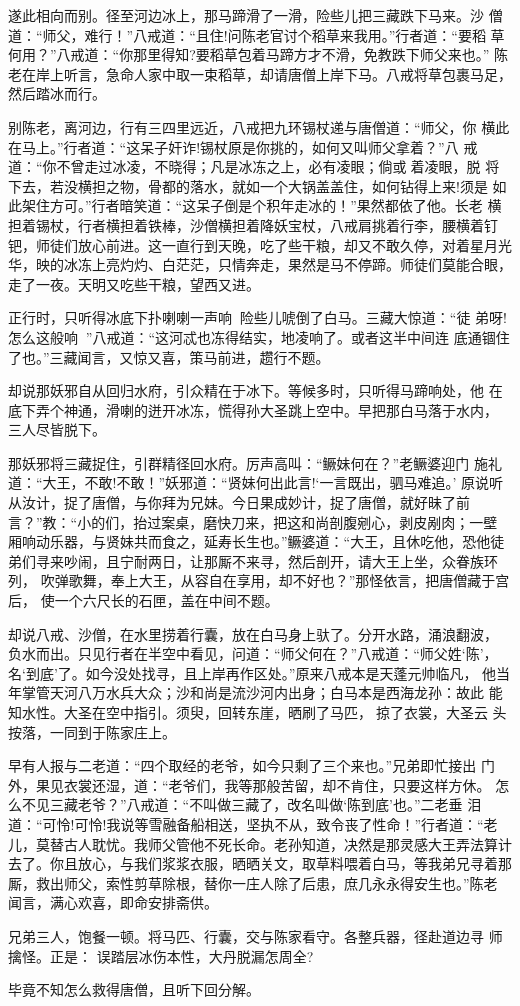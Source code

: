 遂此相向而别。径至河边冰上，那马蹄滑了一滑，险些儿把三藏跌下马来。沙
僧道：“师父，难行！”八戒道：“且住!问陈老官讨个稻草来我用。”行者道：“要稻
草何用？”八戒道：“你那里得知?要稻草包着马蹄方才不滑，免教跌下师父来也。”
陈老在岸上听言，急命人家中取一束稻草，却请唐僧上岸下马。八戒将草包裹马足，
然后踏冰而行。

别陈老，离河边，行有三四里远近，八戒把九环锡杖递与唐僧道：“师父，你
横此在马上。”行者道：“这呆子奸诈!锡杖原是你挑的，如何又叫师父拿着？”八
戒道：“你不曾走过冰凌，不晓得；凡是冰冻之上，必有凌眼；倘或着凌眼，脱
将下去，若没横担之物，骨都的落水，就如一个大锅盖盖住，如何钻得上来!须是
如此架住方可。”行者暗笑道：“这呆子倒是个积年走冰的！”果然都依了他。长老
横担着锡杖，行者横担着铁棒，沙僧横担着降妖宝杖，八戒肩挑着行李，腰横着钉
钯，师徒们放心前进。这一直行到天晚，吃了些干粮，却又不敢久停，对着星月光
华，映的冰冻上亮灼灼、白茫茫，只情奔走，果然是马不停蹄。师徒们莫能合眼，
走了一夜。天明又吃些干粮，望西又进。

正行时，只听得冰底下扑喇喇一声响，险些儿唬倒了白马。三藏大惊道：“徒
弟呀!怎么这般响？”八戒道：“这河忒也冻得结实，地凌响了。或者这半中间连
底通锢住了也。”三藏闻言，又惊又喜，策马前进，趱行不题。

却说那妖邪自从回归水府，引众精在于冰下。等候多时，只听得马蹄响处，他
在底下弄个神通，滑喇的迸开冰冻，慌得孙大圣跳上空中。早把那白马落于水内，
三人尽皆脱下。

那妖邪将三藏捉住，引群精径回水府。厉声高叫：“鳜妹何在？”老鳜婆迎门
施礼道：“大王，不敢!不敢！”妖邪道：“贤妹何出此言!‘一言既出，驷马难追。’
原说听从汝计，捉了唐僧，与你拜为兄妹。今日果成妙计，捉了唐僧，就好昧了前
言？”教：“小的们，抬过案桌，磨快刀来，把这和尚剖腹剜心，剥皮剐肉；一壁
厢响动乐器，与贤妹共而食之，延寿长生也。”鳜婆道：“大王，且休吃他，恐他徒
弟们寻来吵闹，且宁耐两日，让那厮不来寻，然后剖开，请大王上坐，众眷族环列，
吹弹歌舞，奉上大王，从容自在享用，却不好也？”那怪依言，把唐僧藏于宫后，
使一个六尺长的石匣，盖在中间不题。

却说八戒、沙僧，在水里捞着行囊，放在白马身上驮了。分开水路，涌浪翻波，
负水而出。只见行者在半空中看见，问道：“师父何在？”八戒道：“师父姓‘陈’，
名‘到底’了。如今没处找寻，且上岸再作区处。”原来八戒本是天蓬元帅临凡，
他当年掌管天河八万水兵大众；沙和尚是流沙河内出身；白马本是西海龙孙：故此
能知水性。大圣在空中指引。须臾，回转东崖，晒刷了马匹，掠了衣裳，大圣云
头按落，一同到于陈家庄上。

早有人报与二老道：“四个取经的老爷，如今只剩了三个来也。”兄弟即忙接出
门外，果见衣裳还湿，道：“老爷们，我等那般苦留，却不肯住，只要这样方休。
怎么不见三藏老爷？”八戒道：“不叫做三藏了，改名叫做‘陈到底’也。”二老垂
泪道：“可怜!可怜!我说等雪融备船相送，坚执不从，致令丧了性命！”行者道：“老
儿，莫替古人耽忧。我师父管他不死长命。老孙知道，决然是那灵感大王弄法算计
去了。你且放心，与我们浆浆衣服，晒晒关文，取草料喂着白马，等我弟兄寻着那
厮，救出师父，索性剪草除根，替你一庄人除了后患，庶几永永得安生也。”陈老
闻言，满心欢喜，即命安排斋供。

兄弟三人，饱餐一顿。将马匹、行囊，交与陈家看守。各整兵器，径赴道边寻
师擒怪。正是：
误踏层冰伤本性，大丹脱漏怎周全?

毕竟不知怎么救得唐僧，且听下回分解。